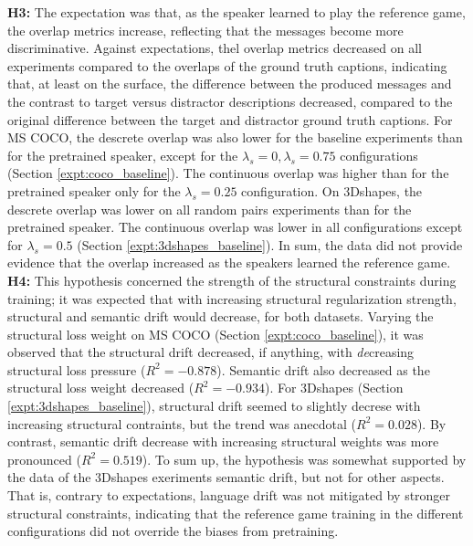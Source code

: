 \textbf{H3:} The expectation was that, as the speaker learned to play the reference game, the overlap metrics increase, reflecting that the messages become more discriminative. Against expectations, thel overlap metrics decreased on all experiments compared to the overlaps of the ground truth captions, indicating that, at least on the surface, the difference between the produced messages and the contrast to target versus distractor descriptions decreased, compared to the original difference between the target and distractor ground truth captions. For MS COCO, the descrete overlap was also lower for the baseline experiments than for the pretrained speaker, except for the $\lambda_s = 0, \lambda_s = 0.75$ configurations (Section \ref{expt:coco_baseline}). The continuous overlap was higher than for the pretrained speaker only for the $\lambda_s = 0.25$ configuration.
On 3Dshapes, the descrete overlap was lower on all random pairs experiments than for the pretrained speaker. The continuous overlap was lower in all configurations except for $\lambda_s=0.5$ (Section \ref{expt:3dshapes_baseline}). In sum, the data did not provide evidence that the overlap increased as the speakers learned the reference game.  \newline
\textbf{H4:} This hypothesis concerned the strength of the structural constraints during training; it was expected that with increasing structural regularization strength, structural and semantic drift would decrease, for both datasets. Varying the structural loss weight on MS COCO (Section \ref{expt:coco_baseline}), it was observed that the structural drift decreased, if anything, with \textit{de}creasing structural loss pressure ($R^2 = -0.878$). Semantic drift also decreased as the structural loss weight decreased ($R^2 = -0.934$). For 3Dshapes (Section \ref{expt:3dshapes_baseline}), structural drift seemed to slightly decrese with increasing structural contraints, but the trend was anecdotal ($R^2=0.028$). By contrast, semantic drift decrease with increasing structural weights was more pronounced ($R^2 = 0.519$). To sum up, the hypothesis was somewhat supported by the data of the 3Dshapes exeriments semantic drift, but not for other aspects. That is, contrary to expectations, language drift was not mitigated by stronger structural constraints, indicating that the reference game training in the different configurations did not override the biases from pretraining.  \newline
